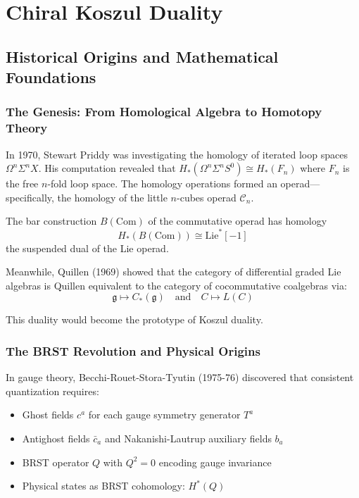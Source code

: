 \chapter{Chiral Koszul Duality}


\section{Historical Origins and Mathematical Foundations}

\subsection{The Genesis: From Homological Algebra to Homotopy Theory}

In 1970, Stewart Priddy was investigating the homology of iterated loop spaces $\Omega^n\Sigma^n X$. His computation revealed that $H_*(\Omega^n\Sigma^n S^0) \cong H_*(F_n)$ where $F_n$ is the free $n$-fold loop space. The homology operations formed an operad—specifically, the homology of the little $n$-cubes operad $\mathcal{C}_n$.

\begin{theorem}
The bar construction $B(\text{Com})$ of the commutative operad has homology 
$$H_*(B(\text{Com})) \cong \text{Lie}^*[-1]$$
the suspended dual of the Lie operad.
\end{theorem}

Meanwhile, Quillen (1969) showed that the category of differential graded Lie algebras is Quillen equivalent to the category of cocommutative coalgebras via:
$$\mathfrak{g} \mapsto C_*(\mathfrak{g}) \quad \text{and} \quad C \mapsto L(C)$$

This duality would become the prototype of Koszul duality.

\subsection{The BRST Revolution and Physical Origins}

In gauge theory, Becchi-Rouet-Stora-Tyutin (1975-76) discovered that consistent quantization requires:
\begin{itemize}
\item Ghost fields $c^a$ for each gauge symmetry generator $T^a$
\item Antighost fields $\bar{c}_a$ and Nakanishi-Lautrup auxiliary fields $b_a$
\item BRST operator $Q$ with $Q^2 = 0$ encoding gauge invariance
\item Physical states as BRST cohomology: $H^*(Q)$
\end{itemize}

